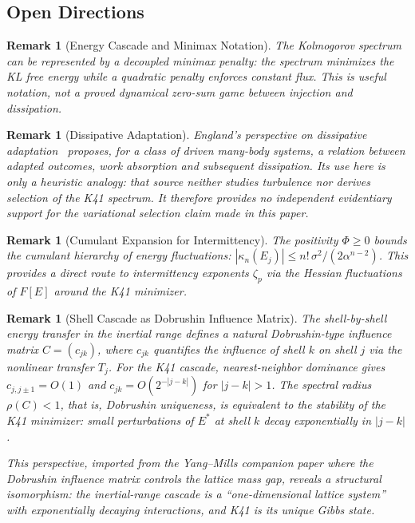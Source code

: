 \documentclass[12pt,a4paper]{article}
\theoremstyle{breakdef}
\theoremstyle{breakplain}
\theoremstyle{breakdef}
\newtheorem{remark}[definition]{Remark}
\begin{document}
\subsection{Open Directions}

\begin{remark}[Energy Cascade and Minimax Notation]
The Kolmogorov spectrum can be represented by a decoupled minimax penalty:
the spectrum minimizes the KL free energy while a quadratic penalty enforces
constant flux. This is useful notation, not a proved dynamical zero-sum game
between injection and dissipation.
\end{remark}

\begin{remark}[Dissipative Adaptation]
England's perspective on dissipative adaptation~\cite{England2015} proposes,
for a class of driven many-body systems, a relation between adapted outcomes,
work absorption and subsequent dissipation. Its use here is only a heuristic
analogy: that source neither studies turbulence nor derives selection of the
K41 spectrum. It therefore provides no independent evidentiary support for
the variational selection claim made in this paper.
\end{remark}

\begin{remark}[Cumulant Expansion for Intermittency]
The positivity $\Phi \geq 0$ bounds the cumulant hierarchy of energy fluctuations: $|\kappa_n(E_j)| \leq n! \, \sigma^2 / (2\alpha^{n-2})$. This provides a direct route to intermittency exponents $\zeta_p$ via the Hessian fluctuations of $F[E]$ around the K41 minimizer.
\end{remark}



\begin{remark}[Shell Cascade as Dobrushin Influence Matrix]
\label{rem:dobrushin-cascade}
The shell-by-shell energy transfer in the inertial range defines a
natural Dobrushin-type influence matrix $C = (c_{jk})$, where $c_{jk}$
quantifies the influence of shell $k$ on shell $j$ via the nonlinear
transfer $T_j$. For the K41 cascade, nearest-neighbor dominance gives
$c_{j,j\pm 1} = O(1)$ and
$c_{jk} = O(2^{-|j-k|})$ for $|j-k| > 1$. The spectral radius
$\rho(C) < 1$, that is, Dobrushin uniqueness, is equivalent to the
stability of the K41 minimizer: small perturbations of $E^*$ at shell
$k$ decay exponentially in $|j-k|$.

This perspective, imported from the Yang--Mills companion paper where the
Dobrushin influence matrix controls the lattice mass gap, reveals a
structural isomorphism: the inertial-range cascade is a
``one-dimensional lattice system'' with exponentially decaying
interactions, and K41 is its unique Gibbs state.
\end{remark}
\end{document}
